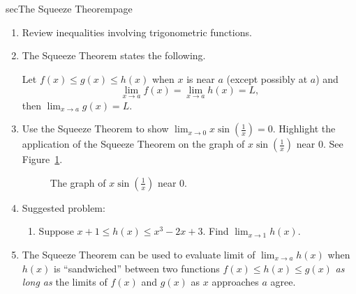 \documentclass[../main.tex]{subfiles}
\begin{document}
\begin{outline}{sec}{The Squeeze Theorem}{page}
  \begin{enumerate}
    \item Review inequalities involving trigonometric functions.
    \item The Squeeze Theorem states the following.
          \begin{mdframed}[style=simple]
            Let \(f(x) \le g(x) \le h(x)\) when \(x\) is near \(a\) (except possibly at \(a\)) and
            \[
              \lim_{x \to a}f(x) = \lim_{x \to a} h(x) = L,
            \]
            then \({\lim_{x \to a}} g(x) = L\).
          \end{mdframed}
    \item Use the Squeeze Theorem to show \({\lim_{x \to 0}} x \sin\left( \frac{1}{x} \right) = 0\). Highlight the application of the Squeeze Theorem on the graph of \(x \sin(\frac{1}{x})\) near \(0\). See Figure~\ref{fig:squeeze}.
          \begin{figure}[h!]
            \centering
            \caption{The graph of \(x \sin(\frac{1}{x})\) near \(0\).}
            \label{fig:squeeze}
          \end{figure}

    \item Suggested problem:
          \begin{enumerate}
            \item Suppose \(x + 1 \le h(x) \le x^{3} - 2 x + 3\). Find \({\lim_{x \to 1}} h(x)\).
          \end{enumerate}
    \item The Squeeze Theorem can be used to evaluate limit of \(\lim_{x \to a} h(x)\) when \(h(x)\) is ``sandwiched'' between two functions \(f(x) \le h(x) \le g(x)\) \emph{as long as} the limits of \(f(x)\) and \(g(x)\) as \(x\) approaches \(a\) agree.
  \end{enumerate}
\end{outline}
\end{document}
